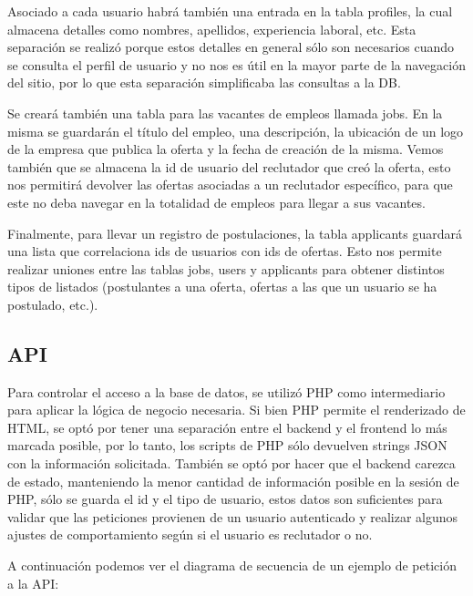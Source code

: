 \documentclass[a4paper]{article}
\begin{document}
Asociado a cada usuario habrá también una entrada en la tabla profiles, la
cual almacena detalles como nombres, apellidos, experiencia laboral, etc. Esta
separación se realizó porque estos detalles en general sólo son necesarios
cuando se consulta el perfil de usuario y no nos es útil en la mayor parte de
la navegación del sitio, por lo que esta separación simplificaba las
consultas a la DB.

Se creará también una tabla para las vacantes de empleos llamada jobs. En la
misma se guardarán el título del empleo, una descripción, la ubicación de un
logo de la empresa que publica la oferta y la fecha de creación de la misma.
Vemos también que se almacena la id de usuario del reclutador que creó la
oferta, esto nos permitirá devolver las ofertas asociadas a un reclutador
específico, para que este no deba navegar en la totalidad de empleos para
llegar a sus vacantes.

Finalmente, para llevar un registro de postulaciones, la tabla applicants
guardará una lista que correlaciona ids de usuarios con ids de ofertas. Esto
nos permite realizar uniones entre las tablas jobs, users y applicants para
obtener distintos tipos de listados (postulantes a una oferta, ofertas a las
que un usuario se ha postulado, etc.).

\subsection{API}
Para controlar el acceso a la base de datos, se utilizó PHP como intermediario
para aplicar la lógica de negocio necesaria. Si bien PHP permite el renderizado
de HTML, se optó por tener una separación entre el backend y el frontend lo más
marcada posible, por lo tanto, los scripts de PHP sólo devuelven strings JSON
con la información solicitada. También se optó por hacer que el backend carezca
de estado, manteniendo la menor cantidad de información posible en la sesión de
PHP, sólo se guarda el id y el tipo de usuario, estos datos son suficientes
para validar que las peticiones provienen de un usuario autenticado y realizar
algunos ajustes de comportamiento según si el usuario es reclutador o no.

A continuación podemos ver el diagrama de secuencia de un ejemplo de petición a
la API:
\begin{figure}[H]
    \centering
    \scalebox{.6}{
        
    }
\end{figure}
\end{document}
